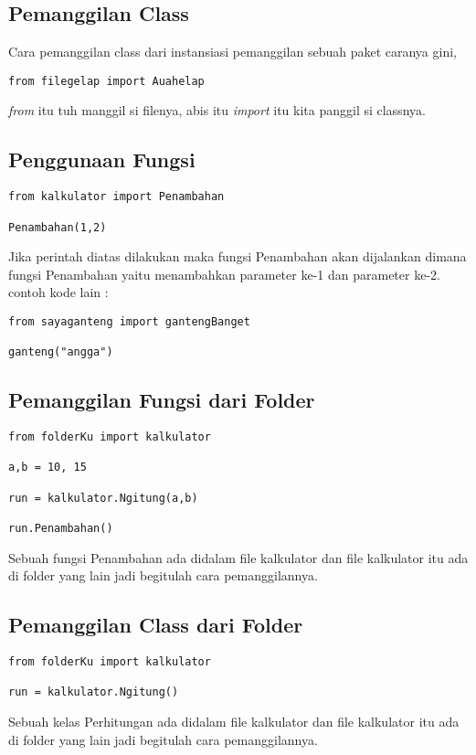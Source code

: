 \subsection{Pemanggilan Class}
Cara pemanggilan class dari instansiasi pemanggilan sebuah paket caranya gini,
\begin{verbatim}
from filegelap import Auahelap
\end{verbatim}
\textit{from} itu tuh manggil si filenya, abis itu \textit{import} itu kita panggil si classnya.

\subsection{Penggunaan Fungsi}
\begin{verbatim}
from kalkulator import Penambahan

Penambahan(1,2)
\end{verbatim}
Jika perintah diatas dilakukan maka fungsi Penambahan akan dijalankan dimana fungsi Penambahan yaitu menambahkan parameter ke-1 dan parameter ke-2. contoh kode lain :
\begin{verbatim}
from sayaganteng import gantengBanget

ganteng("angga")
\end{verbatim}

\subsection{Pemanggilan Fungsi dari Folder}
\begin{verbatim}
from folderKu import kalkulator

a,b = 10, 15

run = kalkulator.Ngitung(a,b)

run.Penambahan()
\end{verbatim}
Sebuah fungsi Penambahan ada didalam file kalkulator dan file kalkulator itu ada di folder yang lain jadi begitulah cara pemanggilannya.

\subsection{Pemanggilan Class dari Folder}
\begin{verbatim}
from folderKu import kalkulator

run = kalkulator.Ngitung()
\end{verbatim}
Sebuah kelas Perhitungan ada didalam file kalkulator dan file kalkulator itu ada di folder yang lain jadi begitulah cara pemanggilannya.